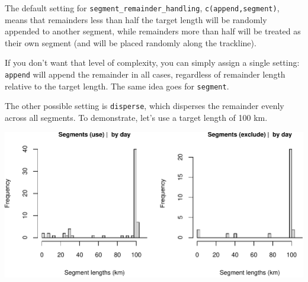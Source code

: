 \documentclass[
]{book}
\newenvironment{Shaded}{\begin{snugshade}}{\end{snugshade}}
\newcommand{\CommentTok}[1]{\textcolor[rgb]{0.56,0.35,0.01}{\textit{#1}}}
\newcommand{\DataTypeTok}[1]{\textcolor[rgb]{0.13,0.29,0.53}{#1}}
\newcommand{\DecValTok}[1]{\textcolor[rgb]{0.00,0.00,0.81}{#1}}
\newcommand{\KeywordTok}[1]{\textcolor[rgb]{0.13,0.29,0.53}{\textbf{#1}}}
\newcommand{\NormalTok}[1]{#1}
\newcommand{\OperatorTok}[1]{\textcolor[rgb]{0.81,0.36,0.00}{\textbf{#1}}}
\newcommand{\OtherTok}[1]{\textcolor[rgb]{0.56,0.35,0.01}{#1}}
\newcommand{\StringTok}[1]{\textcolor[rgb]{0.31,0.60,0.02}{#1}}
\begin{document}
The default setting for \texttt{segment\_remainder\_handling}, \texttt{c(\textquotesingle{}append\textquotesingle{},\textquotesingle{}segment\textquotesingle{})}, means that remainders less than half the target length will be randomly appended to another segment, while remainders more than half will be treated as their own segment (and will be placed randomly along the trackline).

If you don't want that level of complexity, you can simply assign a single setting: \texttt{\textquotesingle{}append\textquotesingle{}} will append the remainder in all cases, regardless of remainder length relative to the target length. The same idea goes for \texttt{\textquotesingle{}segment\textquotesingle{}}.

The other possible setting is \texttt{\textquotesingle{}disperse\textquotesingle{}}, which disperses the remainder evenly across all segments. To demonstrate, let's use a target length of 100 km.

\begin{Shaded}
\end{Shaded}

\includegraphics{figures/unnamed-chunk-368-1.pdf}
\end{document}

